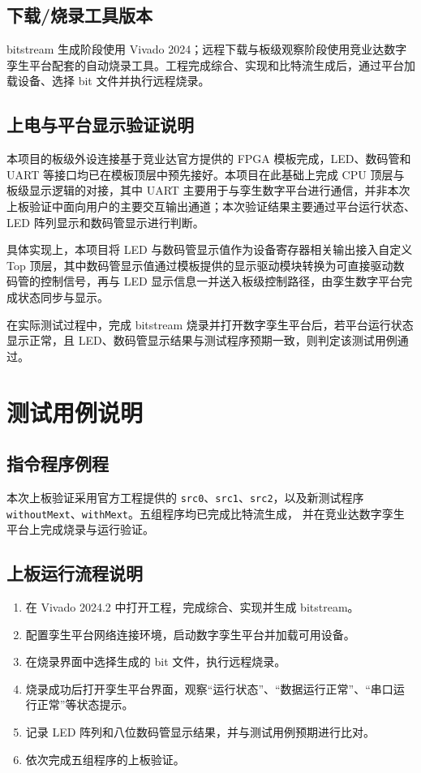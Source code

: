 \documentclass[UTF8,a4paper,12pt]{ctexart}
\begin{document}
\subsection{下载/烧录工具版本}

bitstream 生成阶段使用 Vivado 2024；远程下载与板级观察阶段使用竞业达数字孪生平台配套的自动烧录工具。工程完成综合、实现和比特流生成后，通过平台加载设备、选择 bit 文件并执行远程烧录。

\subsection{上电与平台显示验证说明}

本项目的板级外设连接基于竞业达官方提供的 FPGA 模板完成，LED、数码管和 UART 等接口均已在模板顶层中预先接好。本项目在此基础上完成 CPU 顶层与板级显示逻辑的对接，其中 UART 主要用于与孪生数字平台进行通信，并非本次上板验证中面向用户的主要交互输出通道；本次验证结果主要通过平台运行状态、LED 阵列显示和数码管显示进行判断。

具体实现上，本项目将 LED 与数码管显示值作为设备寄存器相关输出接入自定义 Top 顶层，其中数码管显示值通过模板提供的显示驱动模块转换为可直接驱动数码管的控制信号，再与 LED 显示信息一并送入板级控制路径，由孪生数字平台完成状态同步与显示。

在实际测试过程中，完成 bitstream 烧录并打开数字孪生平台后，若平台运行状态显示正常，且 LED、数码管显示结果与测试程序预期一致，则判定该测试用例通过。

\section{测试用例说明}

\subsection{指令程序例程}

本次上板验证采用官方工程提供的 \texttt{src0}、\texttt{src1}、\texttt{src2}，以及新测试程序
\texttt{withoutMext}、\texttt{withMext}。五组程序均已完成比特流生成，
并在竞业达数字孪生平台上完成烧录与运行验证。

\subsection{上板运行流程说明}

\begin{enumerate}[label=\arabic*）]
  \item 在 Vivado 2024.2 中打开工程，完成综合、实现并生成 bitstream。
  \item 配置孪生平台网络连接环境，启动数字孪生平台并加载可用设备。
  \item 在烧录界面中选择生成的 bit 文件，执行远程烧录。
  \item 烧录成功后打开孪生平台界面，观察``运行状态''、``数据运行正常''、``串口运行正常''等状态提示。
  \item 记录 LED 阵列和八位数码管显示结果，并与测试用例预期进行比对。
  \item 依次完成五组程序的上板验证。
\end{enumerate}
\end{document}
